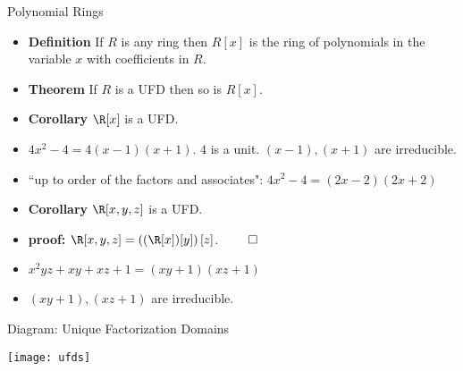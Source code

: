 \documentclass{beamer}
\begin{document}
\begin{frame}{Polynomial Rings}

\begin{itemize}
  \item \textbf{Definition} If $R$ is any ring then $R[x]$ is the ring of polynomials in the variable $x$ with coefficients in $R$.
  \item \textbf{Theorem} If $R$ is a UFD then so is $R[x]$.
  \item \textbf{Corollary} $\R[x]$ is a UFD.
  \item $4x^2 -4 = 4(x-1)(x+1)$. $4$ is a unit. $(x-1),(x+1)$ are irreducible.
  \item ``up to order of the factors and associates": $4x^2 -4 = (2x-2)(2x+2)$
  \item \textbf{Corollary} $\R[x,y,z]$ is a UFD.
  \item \textbf{proof:} $\R[x,y,z] = \left( (\R[x])[y] \right ) [z]$. $\qed$
  \item $x^2yz +xy +xz +1 = (xy+1)(xz+1)$
  \item $(xy+1), (xz+1)$ are irreducible.
\end{itemize}

\end{frame}


\begin{frame}{Diagram: Unique Factorization Domains}

\begin{center}
\texttt{[image: ufds]}
\end{center}

\end{frame}



\end{document}
